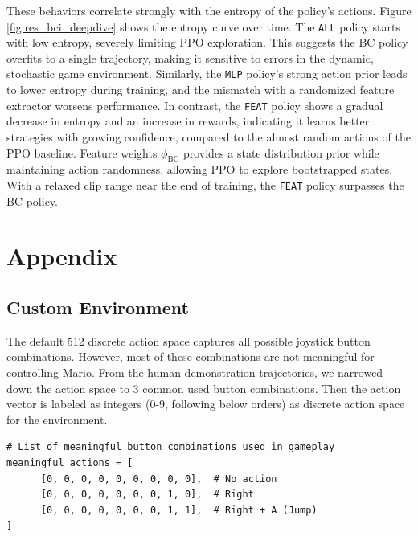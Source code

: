 \documentclass{article}
\begin{document}
These behaviors correlate strongly with the entropy of the policy's 
actions. Figure \ref{fig:res_bci_deepdive} shows the entropy curve over 
time. The \texttt{ALL} policy starts with low entropy, severely limiting 
PPO exploration. This suggests the BC policy overfits to a single 
trajectory, making it sensitive to errors in the dynamic, stochastic 
game environment. Similarly, the \texttt{MLP} policy's strong action 
prior leads to lower entropy during training, and the mismatch with a 
randomized feature extractor worsens performance. In contrast, the 
\texttt{FEAT} policy shows a gradual decrease in entropy and an increase 
in rewards, indicating it learns better strategies with growing 
confidence, compared to the almost random actions of the PPO baseline.
Feature weights $\phi_{\text{BC}}$ provides a state distribution prior while 
maintaining action randomness, allowing PPO to explore bootstrapped 
states. With a relaxed clip range near the end of training, the 
\texttt{FEAT} policy surpasses the BC policy.

\clearpage



\clearpage
\appendix
\renewcommand{\thefigure}{A\arabic{figure}}
\renewcommand{\thetable}{A\arabic{table}}
\setcounter{figure}{0}
\setcounter{table}{0}
\onecolumn
\section{Appendix}
\subsection{Custom Environment}
\label{a1:custom_env}

The default 512 discrete action space captures all possible joystick button 
combinations. However, most of these combinations are not meaningful for 
controlling Mario. From the human demonstration trajectories, we narrowed down 
the action space to 3 common used button combinations.
Then the action vector is labeled as integers (0-9, following below orders)
as discrete action space for the environment.

\begin{verbatim}
# List of meaningful button combinations used in gameplay
meaningful_actions = [
      [0, 0, 0, 0, 0, 0, 0, 0, 0],  # No action
      [0, 0, 0, 0, 0, 0, 0, 1, 0],  # Right
      [0, 0, 0, 0, 0, 0, 0, 1, 1],  # Right + A (Jump)
]
\end{verbatim}
\end{document}
